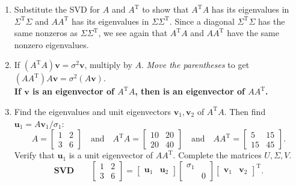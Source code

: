 \documentclass[14pt, a4paper]{article}
\begin{document}
\begin{enumerate}
    \item Substitute the SVD for $A$ and $A^{\mathrm{T}}$ to show that $A^{\mathrm{T}}A$ has its eigenvalues in $\Sigma^{\mathrm{T}}\Sigma$ and $AA^{\mathrm{T}}$ has its eigenvalues in $\Sigma\Sigma^{\mathrm{T}}$. Since a diagonal $\Sigma^{\mathrm{T}}\Sigma$ has the same nonzeros as $\Sigma\Sigma^{\mathrm{T}}$, we see again that $A^{\mathrm{T}}A$ and $AA^{\mathrm{T}}$ have the same nonzero eigenvalues.

    \item If $(A^{\mathrm{T}}A)\boldsymbol{v} = \sigma^2\boldsymbol{v}$, multiply by $A$. \textit{Move the parentheses} to get $(AA^{\mathrm{T}})A\boldsymbol{v} = \sigma^2(A\boldsymbol{v})$. \\
          \textbf{If $\boldsymbol{v}$ is an eigenvector of $A^{\mathrm{T}}A$, then \underline{\hspace{1cm}} is an eigenvector of $AA^{\mathrm{T}}$.}

    \item Find the eigenvalues and unit eigenvectors $\boldsymbol{v}_1, \boldsymbol{v}_2$ of $A^{\mathrm{T}}A$. Then find $\boldsymbol{u}_1 = A\boldsymbol{v}_1/\sigma_1$:
          \[
              A = \begin{bmatrix} 1 & 2 \\ 3 & 6 \end{bmatrix} \quad \text{and} \quad A^{\mathrm{T}}A = \begin{bmatrix} 10 & 20 \\ 20 & 40 \end{bmatrix} \quad \text{and} \quad AA^{\mathrm{T}} = \begin{bmatrix} 5 & 15 \\ 15 & 45 \end{bmatrix}.
          \]
          Verify that $\boldsymbol{u}_1$ is a unit eigenvector of $AA^{\mathrm{T}}$. Complete the matrices $U, \Sigma, V$.
          \[
              \textbf{SVD} \qquad \begin{bmatrix} 1 & 2 \\ 3 & 6 \end{bmatrix} = \begin{bmatrix} \boldsymbol{u}_1 & \boldsymbol{u}_2 \end{bmatrix} \begin{bmatrix} \sigma_1 & \\ & 0 \end{bmatrix} \begin{bmatrix} \boldsymbol{v}_1 & \boldsymbol{v}_2 \end{bmatrix}^{\mathrm{T}}.
          \]


\end{enumerate}
\end{document}
